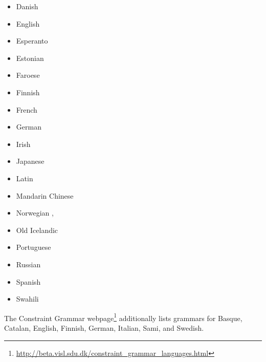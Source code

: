 \begin{itemize}
\item Danish       \citep{Bick2001a-u,BN2007a-u}
\item English     \citep{MIF85a,SN86a,LR87a,Hudson89a,ST91a-u,VHA92a-u,IKKLP92a-u,Coch96a}
\item Esperanto \citep{Bick2009a-u} 
\item Estonian   \citep*{Mueuerisep99a-u,MPMKRU2003a-u}
\item Faroese     \citep{Trosterud2009a-u}
\item Finnish     \citep*{NJL84a-u,JLV86a-u}
\item French       \citep{IKKLP92a-u,Coch96a,Bick2010a-u}
\item German       \citep{Hellwig86a-u,Coch96a,HKMS98a-u,MS98c-u,Hellwig2003a,Hellwig2006a,GK2001a}
\item Irish         \citep{DvG2006a-u}
\item Japanese   \citep*{MIF85a}
\item Latin         \citep{Covington90a}
\item Mandarin Chinese \citep{LW2006a-u,Liu2009a-u}
\item Norwegian               \citep*{HBN2000a-u},
\item Old Icelandic       \citep{Maas77a}
\item Portuguese             \citep{Bick2003a-u} 
\item Russian                   \citep{HZ60a-u,Melcuk64a-u,Covington90a}
\item Spanish                   \citep{Coch96a,Bick2006a-u}
\item Swahili                   \citep{Hurskainen2006a-u}
\end{itemize}
The Constraint Grammar webpage\footnote{
  \url{http://beta.visl.sdu.dk/constraint_grammar_languages.html}
} additionally lists grammars for
Basque,
Catalan,
English,
Finnish,
German,
Italian,
Sami, and
Swedish.
%
